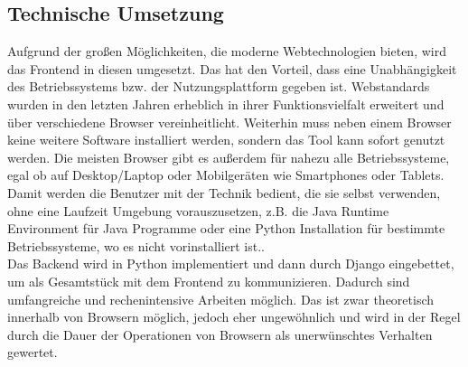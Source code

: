 \subsection{Technische Umsetzung}
Aufgrund der großen Möglichkeiten, die moderne Webtechnologien bieten, wird das
Frontend in diesen umgesetzt. Das hat den Vorteil, dass eine Unabhängigkeit des
Betriebssystems bzw. der Nutzungsplattform gegeben ist. Webstandards wurden in
den letzten Jahren erheblich in ihrer Funktionsvielfalt erweitert und über
verschiedene Browser vereinheitlicht. Weiterhin muss neben einem Browser keine
weitere Software installiert werden, sondern das Tool kann sofort genutzt
werden. Die meisten Browser gibt es außerdem für nahezu alle Betriebssysteme,
egal ob auf Desktop/Laptop oder Mobilgeräten wie Smartphones oder Tablets. Damit
werden die Benutzer mit der Technik bedient, die sie selbst verwenden, ohne
eine Laufzeit Umgebung vorauszusetzen, z.B. die Java Runtime Environment für
Java Programme oder eine Python Installation für bestimmte
Betriebssysteme, wo es nicht vorinstalliert ist..\\
Das Backend wird in Python implementiert und dann durch Django eingebettet, um
als Gesamtstück mit dem Frontend zu kommunizieren. Dadurch sind umfangreiche und
rechenintensive Arbeiten möglich. Das ist zwar theoretisch innerhalb von
Browsern möglich, jedoch eher ungewöhnlich und wird in der Regel durch die Dauer
der Operationen von Browsern als unerwünschtes Verhalten gewertet.


